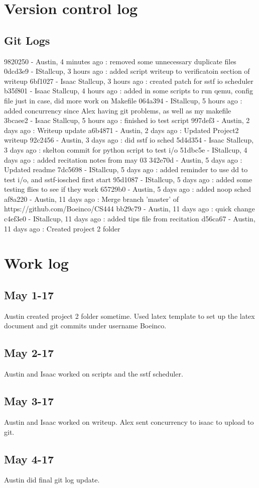 \documentclass[letterpaper,10pt,titlepage]{article}
\begin{document}
\section{Version control log}
\subsection{Git Logs}
9820250 - Austin, 4 minutes ago : removed some unnecessary duplicate files
0dcd3e9 - IStallcup, 3 hours ago : added script writeup to verificatoin section of writeup
6bf1027 - Isaac Stallcup, 3 hours ago : created patch for sstf io scheduler
b35f801 - Isaac Stallcup, 4 hours ago : added in some scripts to run qemu, config file just in case, did more work on Makefile
064a394 - IStallcup, 5 hours ago : added concurrency since Alex having git problems, as well as my makefile
3bcaee2 - Isaac Stallcup, 5 hours ago : finished io test script
997def3 - Austin, 2 days ago : Writeup update
a6b4871 - Austin, 2 days ago : Updated Project2 writeup
92c2456 - Austin, 3 days ago : did sstf io sched
5d4d354 - Isaac Stallcup, 3 days ago : skelton commit for python script to test i/o
51dbc5e - IStallcup, 4 days ago : added recitation notes from may 03
342e70d - Austin, 5 days ago : Updated readme
7dc5698 - IStallcup, 5 days ago : added reminder to use dd to test i/o, and sstf-iosched first start
95d1087 - IStallcup, 5 days ago : added some testing flies to see if they work
65729b0 - Austin, 5 days ago : added noop sched
af8a220 - Austin, 11 days ago : Merge branch 'master' of https://github.com/Boeinco/CS444
bb29c79 - Austin, 11 days ago : quick change
c4ef3e0 - IStallcup, 11 days ago : added tips file from recitation
d56ca67 - Austin, 11 days ago : Created project 2 folder
\section{Work log}

\subsection{May 1-17}
Austin created project 2 folder sometime.  Used latex template to set up the latex document and git commits under username Boeinco.
\subsection{May 2-17}
Austin and Isaac worked on scripts and the sstf scheduler.
\subsection{May 3-17}
Austin and Isaac worked on writeup. Alex sent concurrency to isaac to upload to git.
\subsection{May 4-17}
Austin did final git log update.

%
%
\end{document}
